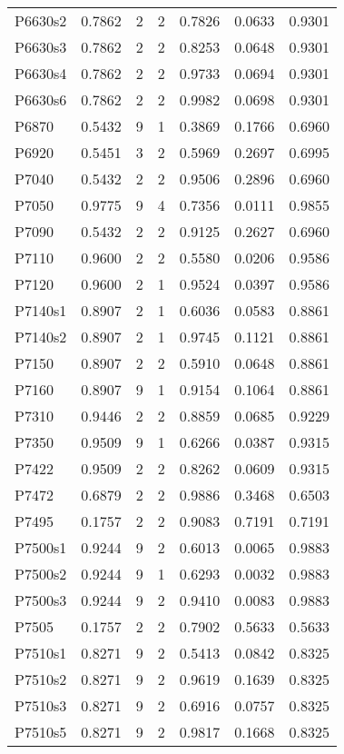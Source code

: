 \begin{longtable}{lrrrrrr}
P6630s2 & 0.7862 & 2 & 2 & 0.7826 & 0.0633 & 0.9301 \\
P6630s3 & 0.7862 & 2 & 2 & 0.8253 & 0.0648 & 0.9301 \\
P6630s4 & 0.7862 & 2 & 2 & 0.9733 & 0.0694 & 0.9301 \\
P6630s6 & 0.7862 & 2 & 2 & 0.9982 & 0.0698 & 0.9301 \\
P6870 & 0.5432 & 9 & 1 & 0.3869 & 0.1766 & 0.6960 \\
P6920 & 0.5451 & 3 & 2 & 0.5969 & 0.2697 & 0.6995 \\
P7040 & 0.5432 & 2 & 2 & 0.9506 & 0.2896 & 0.6960 \\
P7050 & 0.9775 & 9 & 4 & 0.7356 & 0.0111 & 0.9855 \\
P7090 & 0.5432 & 2 & 2 & 0.9125 & 0.2627 & 0.6960 \\
P7110 & 0.9600 & 2 & 2 & 0.5580 & 0.0206 & 0.9586 \\
P7120 & 0.9600 & 2 & 1 & 0.9524 & 0.0397 & 0.9586 \\
P7140s1 & 0.8907 & 2 & 1 & 0.6036 & 0.0583 & 0.8861 \\
P7140s2 & 0.8907 & 2 & 1 & 0.9745 & 0.1121 & 0.8861 \\
P7150 & 0.8907 & 2 & 2 & 0.5910 & 0.0648 & 0.8861 \\
P7160 & 0.8907 & 9 & 1 & 0.9154 & 0.1064 & 0.8861 \\
P7310 & 0.9446 & 2 & 2 & 0.8859 & 0.0685 & 0.9229 \\
P7350 & 0.9509 & 9 & 1 & 0.6266 & 0.0387 & 0.9315 \\
P7422 & 0.9509 & 2 & 2 & 0.8262 & 0.0609 & 0.9315 \\
P7472 & 0.6879 & 2 & 2 & 0.9886 & 0.3468 & 0.6503 \\
P7495 & 0.1757 & 2 & 2 & 0.9083 & 0.7191 & 0.7191 \\
P7500s1 & 0.9244 & 9 & 2 & 0.6013 & 0.0065 & 0.9883 \\
P7500s2 & 0.9244 & 9 & 1 & 0.6293 & 0.0032 & 0.9883 \\
P7500s3 & 0.9244 & 9 & 2 & 0.9410 & 0.0083 & 0.9883 \\
P7505 & 0.1757 & 2 & 2 & 0.7902 & 0.5633 & 0.5633 \\
P7510s1 & 0.8271 & 9 & 2 & 0.5413 & 0.0842 & 0.8325 \\
P7510s2 & 0.8271 & 9 & 2 & 0.9619 & 0.1639 & 0.8325 \\
P7510s3 & 0.8271 & 9 & 2 & 0.6916 & 0.0757 & 0.8325 \\
P7510s5 & 0.8271 & 9 & 2 & 0.9817 & 0.1668 & 0.8325 \\

\end{longtable}
